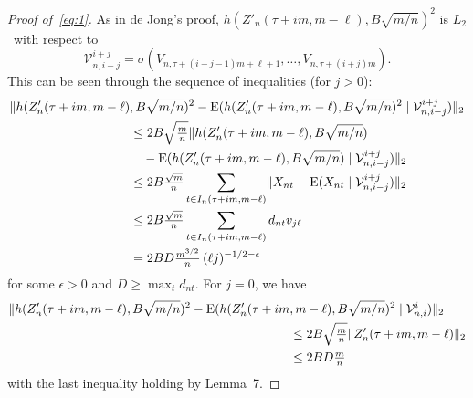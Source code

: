 \documentclass[11pt]{article}
\begin{document}
{\begin{proof}[Proof of~\eqref{eq:1}]
  As in de Jong's proof,
  $h(Z'_n(\tau + im, m-\ell), B \sqrt{m / n})^2$
  is $L_2$ \ned\ with respect to
  \begin{equation*}
    \mathcal{V}_{n,i-j}^{i+j} =
    \sigma(V_{n,\tau + (i-j-1)m + \ell + 1},\dots,
             V_{n,\tau + (i+j)m}).
  \end{equation*}
  This can be seen through the sequence of inequalities (for $j > 0$):
  \begin{align*}
    \lVert h(Z'_n(\tau + im, m-\ell)&, B \sqrt{m / n})^2
    - \operatorname{E}(h(Z'_n(\tau + im, m-\ell), B \sqrt{m / n})^2 \mid
         \mathcal{V}_{n,i-j}^{i+j}) \rVert_2 \\
    & \leq 2 B \sqrt{\tfrac{m}{n}}
    \lVert h(Z'_n(\tau + im, m-\ell), B \sqrt{m / n}) \\
    &\quad- \operatorname{E}(h(Z'_n(\tau + im, m-\ell), B \sqrt{m / n}) \mid
         \mathcal{V}_{n,i-j}^{i+j}) \rVert_2 \\
    &\leq 2 B \tfrac{\sqrt{m}}{n}
    \sum_{t \in I_n(\tau + im, m - \ell)}
    \lVert X_{nt} - \operatorname{E}(X_{nt} \mid \mathcal{V}_{n,i-j}^{i+j}) \rVert_2 \\
    & \leq 2 B \tfrac{\sqrt{m}}{n}
    \sum_{t \in I_n(\tau + im, m - \ell)} d_{nt} v_{j\ell} \\
    &= 2 B D \tfrac{m^{3/2}}{n} \, (\ell j)^{-1/2 - \epsilon}
  \end{align*}
  for some $\epsilon > 0$ and $D \geq \max_t d_{nt}$. For $j = 0$,
  we have
  \begin{align*}
    \lVert h(Z'_n(\tau + im, m-\ell), B \sqrt{m / n})^2
    - \operatorname{E}(h(Z'_n(\tau + im&, m-\ell), B \sqrt{m / n})^2 \mid
         \mathcal{V}_{n,i}^{i}) \rVert_2 \\
    & \leq 2 B \sqrt{\tfrac{m}{n}} \lVert Z'_n(\tau + im, m - \ell) \rVert_2 \\
    & \leq 2 B D \tfrac{m}{n}
  \end{align*}
  with the last inequality holding by Lemma~7.


\end{proof}}
\end{document}
